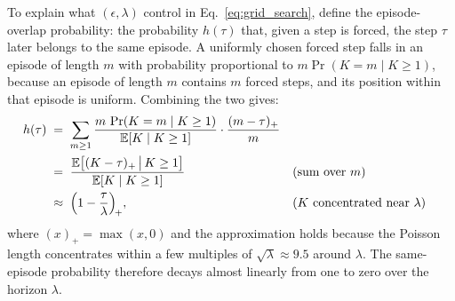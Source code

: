 To explain what $(\epsilon, \lambda)$ control in Eq.~\eqref{eq:grid_search}, define the episode-overlap probability: the probability $h(\tau)$ that, given a step is forced, the
step $\tau$ later belongs to the same episode. A uniformly chosen
forced step falls in an episode of length $m$ with probability
proportional to $m \Pr(K = m \mid K \ge 1)$, because an episode of
length $m$ contains $m$ forced steps, and its position within that
episode is uniform. Combining the two gives:
\begin{align}
  h(\tau)
   &\;=\; \sum_{m \ge 1}
     \frac{m\, \Pr(K = m \mid K \ge 1)}{\mathbb{E}[K \mid K \ge 1]}
     \cdot \frac{(m - \tau)_+}{m}
     \notag \\
   &\;=\; \frac{\mathbb{E}\big[(K - \tau)_+ \,\big|\, K \ge 1\big]}
     {\mathbb{E}[K \mid K \ge 1]}
     && \text{(sum over $m$)} \notag \\
   &\;\approx\; \Big(1 - \frac{\tau}{\lambda}\Big)_{\!+},
     && \text{($K$ concentrated near $\lambda$)}
  \label{eq:supp-h}
\end{align}
where $(x)_+ = \max(x, 0)$ and the approximation holds because the
Poisson length concentrates within a few multiples of
$\sqrt{\lambda} \approx 9.5$ around $\lambda$. The same-episode
probability therefore decays almost linearly from one to zero over
the horizon $\lambda$.

